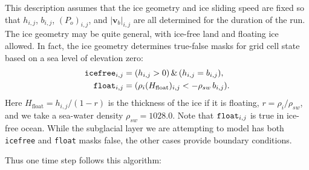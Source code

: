 \documentclass[11pt,final]{amsart}%
\newcommand\bv{\mathbf{v}}
\begin{document}
This description assumes that the ice geometry and ice sliding speed are fixed so that $h_{i,j}$, $b_{i,j}$, $(P_o)_{i,j}$, and $|\bv_b|_{i,j}$ are all determined for the duration of the run.  The ice geometry may be quite general, with ice-free land and floating ice allowed.  In fact, the ice geometry determines true-false masks for grid cell state based on a sea level of elevation zero:
\begin{align*}
\text{\texttt{icefree}}_{i,j} &= (h_{i,j} > 0)\, \&\, (h_{i,j} = b_{i,j}), \\
\text{\texttt{float}}_{i,j}   &= (\rho_i (H_{\text{float}})_{i,j} < - \rho_{sw}\, b_{i,j}).
\end{align*}
Here $H_{\text{float}}=h_{i,j} / (1 - r)$ is the thickness of the ice if it is floating, $r=\rho_i / \rho_{sw}$, and we take a sea-water density $\rho_{sw}=1028.0$.  Note that $\text{\texttt{float}}_{i,j}$ is true in ice-free ocean.  While the subglacial layer we are attempting to model has both \texttt{icefree} and \texttt{float} masks false, the other cases provide boundary conditions.

Thus one time step follows this algorithm:
\end{document}

